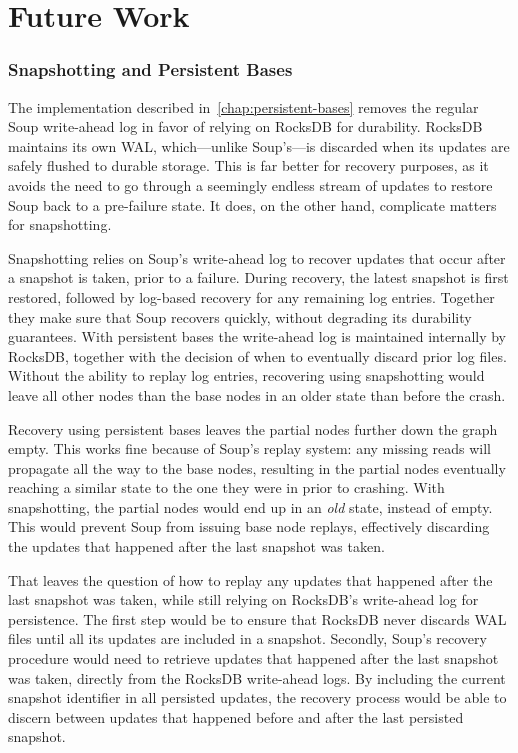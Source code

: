 \chapter{Future Work}\label{chap:future-work}

\subsection{Snapshotting and Persistent Bases}

The  implementation described
in~\ref{chap:persistent-bases} removes the regular Soup write-ahead log in favor
of relying on RocksDB for durability. RocksDB maintains its own WAL,
which---unlike Soup's---is discarded when its updates are safely flushed to
durable storage. This is far better for recovery purposes, as it avoids the need
to go through a seemingly endless stream of updates to restore Soup back to a
pre-failure state. It does, on the other hand, complicate matters for
snapshotting.

Snapshotting relies on Soup's write-ahead log to recover updates that occur
after a snapshot is taken, prior to a failure. During recovery, the latest
snapshot is first restored, followed by log-based recovery for any remaining log
entries. Together they make sure that Soup recovers quickly, without degrading
its durability guarantees. With persistent bases the write-ahead log is
maintained internally by RocksDB, together with the decision of when to
eventually discard prior log files. Without the ability to replay log entries,
recovering using snapshotting would leave all other nodes than the base nodes in
an older state than before the crash.

Recovery using persistent bases leaves the partial nodes further down the graph
empty. This works fine because of Soup's replay system: any missing reads will
propagate all the way to the base nodes, resulting in the partial nodes
eventually reaching a similar state to the one they were in prior to crashing.
With snapshotting, the partial nodes would end up in an \textit{old} state,
instead of empty. This would prevent Soup from issuing base node replays,
effectively discarding the updates that happened after the last snapshot was
taken.

That leaves the question of how to replay any updates that happened after the
last snapshot was taken, while still relying on RocksDB's write-ahead log for
persistence. The first step would be to ensure that RocksDB never discards WAL
files until all its updates are included in a snapshot. Secondly, Soup's
recovery procedure would need to retrieve updates that happened after the last
snapshot was taken, directly from the RocksDB write-ahead logs. By including the
current snapshot identifier in all persisted updates, the recovery process would
be able to discern between updates that happened before and after the last
persisted snapshot.


